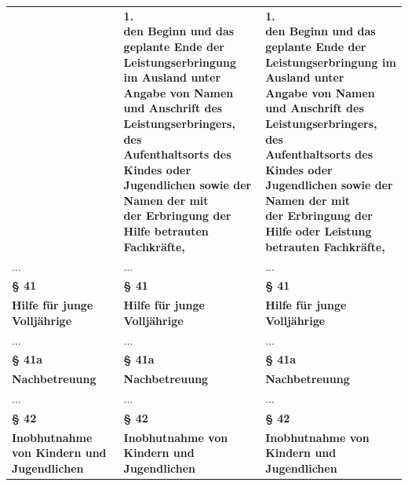 \documentclass[10pt,a4paper,landscape]{article}
\begin{document}
\begin{longtable}{|L{8.2cm}|L{8.2cm}|L{8.2cm}|}
 & \textbf{1.   \newline den Beginn und das geplante Ende der  \newline Leistungserbringung im Ausland unter  \newline Angabe von Namen und Anschrift des  \newline Leistungserbringers, des  \newline Aufenthaltsorts des Kindes oder  \newline Jugendlichen sowie der Namen der mit  \newline der Erbringung der Hilfe betrauten  \newline Fachkräfte, } & \textbf{1.   \newline den Beginn und das geplante Ende der  \newline Leistungserbringung im Ausland unter  \newline Angabe von Namen und Anschrift des  \newline Leistungserbringers, des  \newline Aufenthaltsorts des Kindes oder  \newline Jugendlichen sowie der Namen der mit  \newline der Erbringung der Hilfe }\textbf{\textcolor{diffgreen}{oder Leistung}}\textbf{  \newline betrauten Fachkräfte, } \\
\hhline{|---|}
... & ... & ... \\
\hhline{|---|}
\textbf{\S{} 41} & \textbf{\S{} 41} & \textbf{\S{} 41} \\
\hhline{|---|}
\textbf{Hilfe für junge Volljährige} & \textbf{Hilfe für junge Volljährige} & \textbf{Hilfe für junge Volljährige} \\
\hhline{|---|}
... & ... & ... \\
\hhline{|---|}
\textbf{\S{} 41a} & \textbf{\S{} 41a} & \textbf{\S{} 41a} \\
\hhline{|---|}
\textbf{Nachbetreuung} & \textbf{Nachbetreuung} & \textbf{Nachbetreuung} \\
\hhline{|---|}
... & ... & ... \\
\hhline{|---|}
\textbf{\S{} 42} & \textbf{\S{} 42} & \textbf{\S{} 42} \\
\hhline{|---|}
\textbf{Inobhutnahme von Kindern und  \newline Jugendlichen} & \textbf{Inobhutnahme von Kindern und  \newline Jugendlichen} & \textbf{Inobhutnahme von Kindern und  \newline Jugendlichen} \\

\end{longtable}
\end{document}
